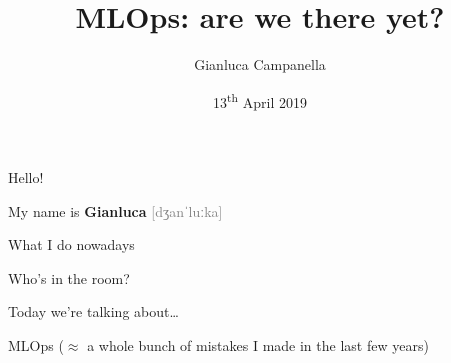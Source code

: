 \documentclass[12pt,aspectratio=169]{beamer}
\title{MLOps: are we there yet?}
\author{Gianluca Campanella}
\date{13\textsuperscript{th} April 2019}
\begin{document}
\maketitle

\begin{frame}{Hello!}
    \begin{center}
        \LARGE%
        My name is \textbf{Gianluca}
        {\textcolor{gray}{[dʒanˈluːka]}}
    \end{center}
\end{frame}

\begin{frame}{What I do nowadays}
    \LARGE%
\end{frame}

\begin{frame}
    \begin{center}
        \LARGE%
        Who's in the room?
    \end{center}
\end{frame}

\begin{frame}{Today we're talking about\ldots}
    \begin{center}
        {\Huge%
         MLOps}
        \vfill\pause
        ($\approx$ a whole bunch of mistakes I made in the last few years)
    \end{center}
\end{frame}
\end{document}
